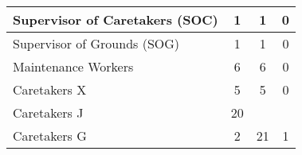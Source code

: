 \begin{tabular}{l|c|c|c|}
    \multicolumn{1}{|l|}{\cellcolor{ccfuschialight}Supervisor of Caretakers (SOC)} & 1                                                      & 1                                                                & 0                                                      \\ \hline
    \multicolumn{1}{|l|}{\cellcolor{ccfuschialight}Supervisor of Grounds (SOG)}    & 1                                                      & 1                                                                & 0                                                      \\ \hline
    \multicolumn{1}{|l|}{\cellcolor{ccfuschialight}Maintenance Workers}            & 6                                                      & 6                                                                & 0                                                       \\ \hline
    \multicolumn{1}{|l|}{\cellcolor{ccfuschialight}Caretakers X}                   & 5                                                      & 5                                                                & 0                                                      \\ \hline
    \multicolumn{1}{|l|}{\cellcolor{ccfuschialight}Caretakers J\tnote{1}}                   & 20                                                      &                                                                 &                                                         \\ \cline{1-2}
    \multicolumn{1}{|l|}{\cellcolor{ccfuschialight}Caretakers G}                   & 2                                                      & \multirow{-2}{*}{21}                                     & \multirow{-2}{*}{1}                           \\ \hline
    \end{tabular}
    